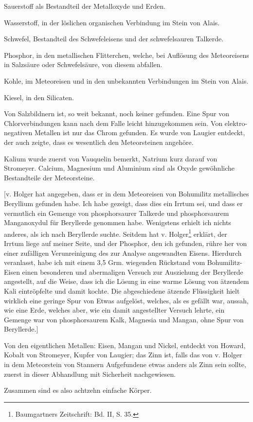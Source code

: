 \documentclass[a4paper, 11pt, oneside]{article}
\begin{document}
Sauerstoff als Bestandteil der Metalloxyde und Erden.

Wasserstoff, in der löslichen organischen Verbindung im Stein von Alais.

Schwefel, Bestandteil des Schwefeleisens und der schwefelsauren Talkerde.

Phosphor, in den metallischen Flitterchen, welche, bei Auflösung des Meteoreisens in Salzsäure oder Schwefelsäure, von diesem abfallen.

Kohle, im Meteoreisen und in den unbekannten Verbindungen im Stein von Alais.

Kiesel, in den Silicaten.

Von Salzbildnern ist, so weit bekannt, noch keiner gefunden. Eine Spur von Chlorverbindungen kann nach dem Falle leicht hinzugekommen sein. Von elektro-negativen Metallen ist nur das Chrom gefunden. Es wurde von Laugier entdeckt, der auch zeigte, dass es wesentlich den Meteorsteinen angehöre.

Kalium wurde zuerst von Vauquelin bemerkt, Natrium kurz darauf von Stromeyer. Calcium, Magnesium und Aluminium sind als Oxyde gewöhnliche Bestandteile der Meteorsteine.

[v. Holger hat angegeben, dass er in dem Meteoreisen von Bohumilitz metallisches Beryllium gefunden habe. Ich habe gezeigt, dass dies ein Irrtum sei, und dass er vermutlich ein Gemenge von phosphorsaurer Talkerde und phosphorsaurem Manganoxydul für Beryllerde genommen habe. Wenigstens erhielt ich nichts anderes, als ich nach Beryllerde suchte. Seitdem hat v. Holger\footnote{Baumgartners Zeitschrift: Bd. II, S. 35.} erklärt, der Irrtum liege auf meiner Seite, und der Phosphor, den ich gefunden, rühre her von einer zufälligen Verunreinigung des zur Analyse angewandten Eisens. Hierdurch veranlasst, habe ich mit einem 3,5 Grm. wiegenden Rückstand vom Bohumilitz-Eisen einen besonderen und abermaligen Versuch zur Ausziehung der Beryllerde angestellt, auf die Weise, dass ich die Lösung in eine warme Lösung von ätzendem Kali eintröpfelte und damit kochte. Die abgeschiedene ätzende Flüssigkeit hielt wirklich eine geringe Spur von Etwas aufgelöst, welches, als es gefällt war, aussah, wie eine Erde, welches aber, wie ein damit angestellter Versuch lehrte, ein Gemenge war von phosphorsaurem Kalk, Magnesia und Mangan, ohne Spur von Beryllerde.]

Von den eigentlichen Metallen: Eisen, Mangan und Nickel, entdeckt von Howard, Kobalt von Stromeyer, Kupfer von Laugier; das Zinn ist, falls das von v. Holger in dem Meteorstein von Stannern Aufgefundene etwas anders als Zinn sein sollte, zuerst in dieser Abhandlung mit Sicherheit nachgewiesen.

Zusammen sind es also achtzehn einfache Körper.
\clearpage
\end{document}
